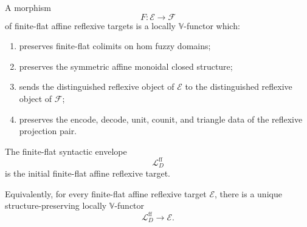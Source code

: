 \begin{definition}
\label{def:morphisms-finite-flat-affine-reflexive-targets}
A morphism
\[
    F:\mathcal E\to\mathcal F
\]
of finite-flat affine reflexive targets is a locally \(\mathbb V\)-functor
which:

\begin{enumerate}
    \item preserves finite-flat colimits on hom fuzzy domains;

    \item preserves the symmetric affine monoidal closed structure;

    \item sends the distinguished reflexive object of \(\mathcal E\) to the
    distinguished reflexive object of \(\mathcal F\);

    \item preserves the encode, decode, unit, counit, and triangle data of the
    reflexive projection pair.
\end{enumerate}
\end{definition}

\begin{theorem}
\label{thm:initiality-finite-flat-syntactic-envelope}
The finite-flat syntactic envelope
\[
    \mathcal L_D^{\mathrm{ff}}
\]
is the initial finite-flat affine reflexive target.

Equivalently, for every finite-flat affine reflexive target \(\mathcal E\),
there is a unique structure-preserving locally \(\mathbb V\)-functor
\[
    \mathcal L_D^{\mathrm{ff}}
    \longrightarrow
    \mathcal E.
\]
\end{theorem}

